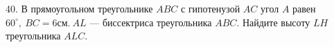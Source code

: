 40. В прямоугольном треугольнике $ABC$ с гипотенузой $AC$ угол $A$ равен $60^\circ,\
BC=6\text{см}.\ AL$ --- биссектриса треугольника $ABC.$ Найдите высоту $LH$ треугольника $ALC.$\\
